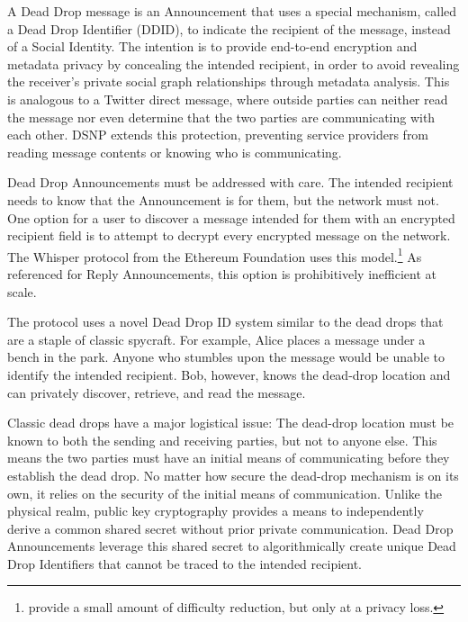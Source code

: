 \documentclass[12pt,letterpaper]{article}
\begin{document}
A Dead Drop message is an Announcement that uses a special mechanism, called a Dead Drop
Identifier (DDID), to indicate the recipient of the message, instead of a Social Identity.
The intention is to provide end-to-end encryption and metadata privacy by concealing the
intended recipient, in order to avoid revealing the receiver's private social graph
relationships through metadata analysis. This is analogous to a Twitter direct message,
where outside parties can neither read the message nor even determine that the two parties
are communicating with each other. DSNP extends this protection, preventing service
providers from reading message contents or knowing who is communicating.

Dead Drop Announcements must be addressed with care. The intended recipient needs to know
that the Announcement is for them, but the network must not. One option for a user to
discover a message intended for them with an encrypted recipient field is to attempt to
decrypt every encrypted message on the network. The Whisper protocol from the Ethereum
Foundation uses this model.\footnote{ provide a small amount of difficulty
	reduction, but only at a privacy loss.\cite{whisper-how}} As referenced for Reply
Announcements, this option is prohibitively inefficient at scale.

The protocol uses a novel Dead Drop ID system similar to the dead drops that are a staple
of classic spycraft. For example, Alice places a message under a bench in the park. Anyone
who stumbles upon the message would be unable to identify the intended recipient. Bob,
however, knows the dead-drop location and can privately discover, retrieve, and read the
message.

Classic dead drops have a major logistical issue: The dead-drop location must be known to
both the sending and receiving parties, but not to anyone else. This means the two parties
must have an initial means of communicating before they establish the dead drop. No matter
how secure the dead-drop mechanism is on its own, it relies on the security of the initial
means of communication. Unlike the physical realm, public key cryptography provides a
means to independently derive a common shared secret without prior private
communication.\cite{diffie-hellman1976} Dead Drop Announcements leverage this shared
secret to algorithmically create unique Dead Drop Identifiers that cannot be traced to the
intended recipient.
\end{document}
